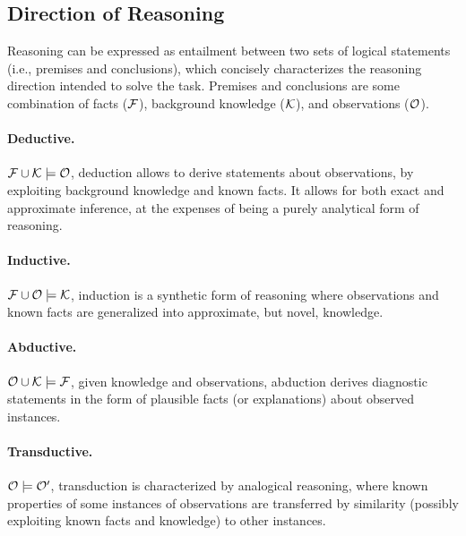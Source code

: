 \subsection{Direction of Reasoning}
Reasoning can be expressed as entailment between two sets of logical statements (i.e., premises and conclusions), which concisely characterizes the reasoning direction intended to solve the task. Premises and conclusions are some combination of facts (${\mathcal{F}}$), background knowledge (${\mathcal{K}}$), and observations (${\mathcal{O}}$).

\paragraph{Deductive.} ${\mathcal{F}} \cup {\mathcal{K}} \models {\mathcal{O}}$, deduction allows to derive statements about observations, by exploiting background knowledge and known facts. It allows for both exact and approximate inference, at the expenses of being a purely analytical form of reasoning. %

\paragraph{Inductive.} ${\mathcal{F}} \cup {\mathcal{O}} \models {\mathcal{K}}$, induction is a synthetic form of reasoning where observations and known facts are generalized into approximate, but novel, knowledge. %

\paragraph{Abductive.} ${\mathcal{O}} \cup {\mathcal{K}} \models {\mathcal{F}}$, given knowledge and observations, abduction derives diagnostic statements in the form of plausible facts (or explanations) about observed instances.

\paragraph{Transductive.}${\mathcal{O}} \models {\mathcal{O}}'$, transduction is characterized by analogical reasoning, where known properties of some instances of observations are transferred by similarity (possibly exploiting known facts and knowledge) to other instances.

